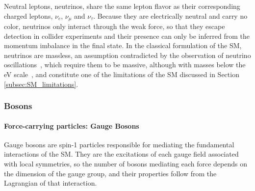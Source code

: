 Neutral leptons, neutrinos, share the same lepton flavor as their corresponding charged leptons, $\nu_e$, $\nu_\mu$ and $\nu_\tau$. Because they are electrically neutral and carry no color, neutrinos only interact through the weak force, so that they escape detection in collider experiments and their presence can only be inferred from the momentum imbalance in the final state. In the classical formulation of the SM, neutrinos are massless, an assumption contradicted by the observation of neutrino oscillations~\cite{Super-Kamiokande:1998kpq,SNO:2002tuh}, which require them to be massive, although with masses below the eV scale~\cite{ParticleDataGroup:2026mpi}, and constitute one of the limitations of the SM discussed in Section \ref{subsec:SM_limitations}.




\subsubsection{Bosons}

\paragraph{Force-carrying particles: Gauge Bosons}
%
Gauge bosons are spin-1 particles responsible for mediating the fundamental interactions of the SM. They are the excitations of each gauge field associated with local symmetries, so the number of bosons mediating each force depends on the dimension of the gauge group, and their properties follow from the Lagrangian of that interaction.

